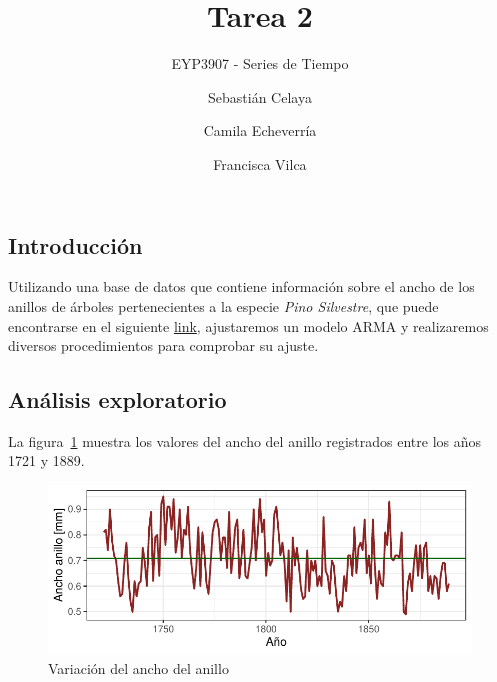 \documentclass[
  letterpaper,
  DIV=11,
  numbers=noendperiod,
  twocolumn]{scrartcl}
\title{Tarea 2}
\subtitle{EYP3907 - Series de Tiempo}
\author{Sebastián Celaya \and Camila Echeverría \and Francisca Vilca}
\date{}
\begin{document}
\maketitle
\ifdefined\Shaded\renewenvironment{Shaded}{\begin{tcolorbox}[breakable, sharp corners, frame hidden, boxrule=0pt, interior hidden, enhanced, borderline west={3pt}{0pt}{shadecolor}]}{\end{tcolorbox}}\fi

\hypertarget{introducciuxf3n}{%
\subsection{Introducción}\label{introducciuxf3n}}

Utilizando una base de datos que contiene información sobre el ancho de
los anillos de árboles pertenecientes a la especie \emph{Pino
Silvestre}, que puede encontrarse en el siguiente
\href{https://www.ncei.noaa.gov/pub/data/paleo/treering/measurements/europe/norw001x-rwl-noaa.txt}{link},
ajustaremos un modelo ARMA y realizaremos diversos procedimientos para
comprobar su ajuste.

\hypertarget{anuxe1lisis-exploratorio}{%
\subsection{Análisis exploratorio}\label{anuxe1lisis-exploratorio}}

La figura~\ref{fig-exp1} muestra los valores del ancho del anillo
registrados entre los años 1721 y 1889.

\begin{figure}[H]

{\centering \includegraphics{pdf_tarea2_files/figure-pdf/fig-exp1-1.pdf}

}

\caption{\label{fig-exp1}Variación del ancho del anillo}

\end{figure}
\end{document}
